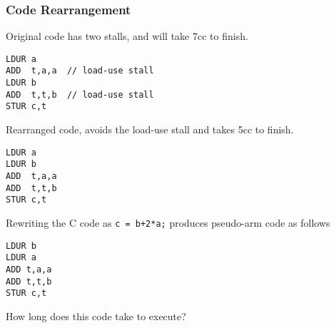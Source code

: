 \begin{frame}[fragile]\frametitle{Code Rearrangement}
\begin{multicols}{2}
Original code has two stalls, and will take 7cc to finish.
\begin{verbatim}
LDUR a      
ADD  t,a,a  // load-use stall
LDUR b
ADD  t,t,b  // load-use stall
STUR c,t
\end{verbatim}

\columnbreak
Rearranged code, avoids the load-use stall and takes 5cc to finish.
\begin{verbatim}
LDUR a
LDUR b
ADD  t,a,a 
ADD  t,t,b 
STUR c,t
\end{verbatim}

\end{multicols}
\begin{tcolorbox}[enhanced,attach boxed title to top center={yshift=-3mm,yshifttext=-1mm},
  colback=blue!5!white,colframe=blue!75!black,colbacktitle=blue!80!black,
  title=Think About It,fonttitle=\bfseries,
  boxed title style={size=small,colframe=red!50!black} ]
  {\footnotesize
 Rewriting the C code as \texttt{c = b+2*a;} produces pseudo-arm code as follows
\begin{verbatim}
LDUR b
LDUR a
ADD t,a,a
ADD t,t,b
STUR c,t
\end{verbatim}
 How long does this code take to execute? \ifnum{}\fi
 }
\end{tcolorbox}


\end{frame}


